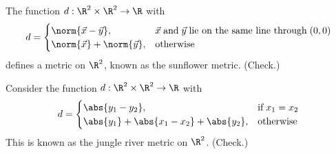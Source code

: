 \begin{negg}
  The function $d:\R^2 \times \R^2 \to \R$ with
  \begin{equation*}
  d = \begin{cases}
  \norm{\vec{x}-\vec{y}}, & \vec{x}\;\text{and}\;\vec{y}\;\text{lie on the same line through}\;(0,0)\\
  \norm{\vec{x}}+\norm{\vec{y}}, & \text{otherwise}
  \end{cases}
  \end{equation*}
  defines a metric on $\R^2$, known as the sunflower metric. (Check.)\eggqed
\end{negg}

\begin{negg}
  Consider the function $d:\R^2 \times \R^2 \to \R$ with
  \begin{equation*}
  d = \begin{cases}
  \abs{y_1 - y_2}, & \text{if}\;x_1 = x_2\\
  \abs{y_1} + \abs{x_1 - x_2} + \abs{y_2}, & \text{otherwise}
  \end{cases}
  \end{equation*}
  This is known as the jungle river metric on $\R^2$. (Check.)\eggqed
\end{negg}

